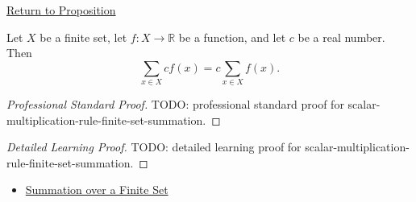 \newpage
{}
\label{prf:scalar-multiplication-rule-finite-set-summation}

\begin{remark*}[Return]
\hyperref[prop:scalar-multiplication-rule-finite-set-summation]{Return to Proposition}
\end{remark*}

\begin{proposition*}
Let \(X\) be a finite set, let \(f:X\to\mathbb{R}\) be a function, and
let \(c\) be a real number. Then
\[
  \sum_{x\in X} c f(x)
  =
  c \sum_{x\in X} f(x).
\]
\end{proposition*}

\begin{proof}[Professional Standard Proof]
\LRAProofBodyStart
TODO: professional standard proof for scalar-multiplication-rule-finite-set-summation.
\end{proof}

\begin{proof}[Detailed Learning Proof]
\LRAProofBodyStart
TODO: detailed learning proof for scalar-multiplication-rule-finite-set-summation.
\end{proof}

\begin{remark*}
\end{remark*}

\begin{dependencies}
\begin{itemize}
  \item \hyperref[def:summation-over-finite-set]{Summation over a Finite Set}
\end{itemize}
\end{dependencies}

\clearpage
